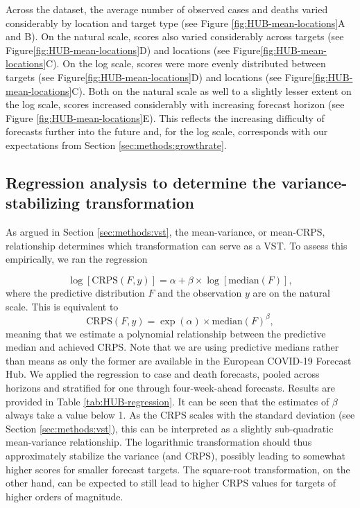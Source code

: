 \documentclass{article}
\begin{document}
Across the dataset, the average number of observed cases and deaths varied considerably by location and target type (see Figure \ref{fig:HUB-mean-locations}A and B). On the natural scale, scores also varied considerably across targets (see Figure\ref{fig:HUB-mean-locations}D) and locations (see Figure\ref{fig:HUB-mean-locations}C). On the log scale, scores were more evenly distributed between targets (see Figure\ref{fig:HUB-mean-locations}D) and locations (see Figure\ref{fig:HUB-mean-locations}C). Both on the natural scale as well to a slightly lesser extent on the log scale, scores increased considerably with increasing forecast horizon (see Figure \ref{fig:HUB-mean-locations}E). This reflects the increasing difficulty of forecasts further into the future and, for the log scale, corresponds with our expectations from Section \ref{sec:methods:growthrate}. 





\subsection{Regression analysis to determine the variance-stabilizing transformation}
\label{sec:HUB-regression}

As argued in Section \ref{sec:methods:vst}, the mean-variance, or mean-CRPS, relationship determines which transformation can serve as a VST. To assess this empirically, we ran the regression

\begin{equation*}
    \log[\text{CRPS}(F, y)] = \alpha + \beta \times \log[\text{median}(F)], 
\end{equation*}
where the predictive distribution $F$ and the observation $y$ are on the natural scale. This is equivalent to
\begin{equation*}
    \text{CRPS}(F, y) = \exp(\alpha) \times \text{median}(F)^\beta, 
\end{equation*}
meaning that we estimate a polynomial relationship between the predictive median and achieved CRPS. Note that we are using predictive medians rather than means as only the former are available in the European COVID-19 Forecast Hub. We applied the regression to case and death forecasts, pooled across horizons and stratified for one through four-week-ahead forecasts. Results are provided in Table \ref{tab:HUB-regression}. It can be seen that the estimates of $\beta$ always take a value below 1.  As the CRPS scales with the standard deviation (see Section \ref{sec:methods:vst}), this can be interpreted as a slightly sub-quadratic mean-variance relationship. The logarithmic transformation should thus approximately stabilize the variance (and CRPS), possibly leading to somewhat higher scores for smaller forecast targets. The square-root transformation, on the other hand, can be expected to still lead to higher CRPS values for targets of higher orders of magnitude.
\end{document}
